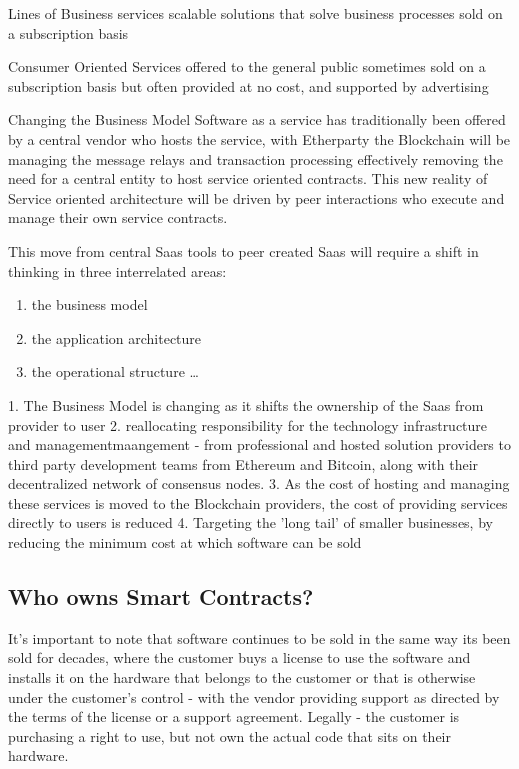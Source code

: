 \documentclass{article}
\begin{document}
Lines of Business services
scalable solutions that solve business processes sold on a subscription basis 

Consumer Oriented Services
offered to the general public sometimes sold on a subscription basis but often provided at no cost, and supported by advertising 

Changing the Business Model
Software as a service has traditionally been offered by a central vendor who hosts the service, with Etherparty the Blockchain will be managing the message relays and transaction processing effectively removing the need for a central entity to host service oriented contracts. This new reality of Service oriented architecture will be driven by peer interactions who execute and manage their own service contracts.

This move from central Saas tools to peer created Saas will require a shift in thinking in three interrelated areas:
\begin{enumerate} %

\item the business model

\item the application architecture

\item the operational structure \ldots

\end{enumerate} 

1. The Business Model is changing as it shifts the ownership of the Saas from provider to user
2. reallocating responsibility for the technology infrastructure and managementmaangement - from professional and hosted solution providers to third party development teams from Ethereum and Bitcoin, along with their decentralized network of consensus nodes.
3. As the cost of hosting and managing these services is moved to the Blockchain providers, the cost of providing services directly to users is reduced 
4. Targeting the 'long tail' of smaller businesses, by reducing the minimum cost at which software can be sold 

\subsection{Who owns Smart Contracts?}

It's important to note that software continues to be sold in the same way its been sold for decades, where the customer buys a license to use the software and installs it on the hardware that belongs to the customer or that is otherwise under the customer's control - with the vendor providing support as directed by the terms of the license or a support agreement. Legally - the customer is purchasing a right to use, but not own the actual code that sits on their hardware. 
\end{document}
